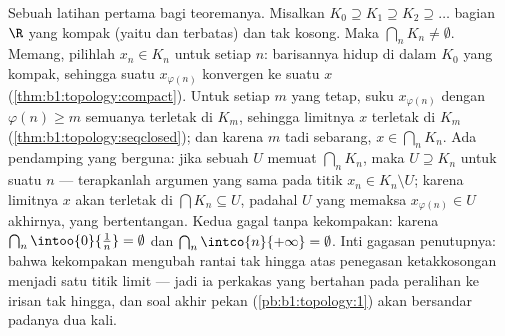 \begin{example}\label{ex:b1:topology:nested}
Sebuah latihan pertama bagi teoremanya. Misalkan $K_0 \supseteq K_1 \supseteq
K_2 \supseteq \dots$  bagian $\R$ yang kompak (yaitu  dan terbatas)
dan tak kosong. Maka $\bigcap_n K_n \neq \emptyset$. Memang, pilihlah $x_n
\in K_n$ untuk setiap $n$: barisannya hidup di dalam $K_0$ yang kompak,
sehingga suatu  $x_{\varphi(n)}$ konvergen ke suatu $x$
(\cref{thm:b1:topology:compact}). Untuk setiap $m$ yang tetap, suku
$x_{\varphi(n)}$ dengan $\varphi(n) \geq m$ semuanya terletak di  $K_m$, sehingga limitnya $x$ terletak di $K_m$
(\cref{thm:b1:topology:seqclosed}); dan karena $m$ tadi sebarang, $x \in
\bigcap_n K_n$. Ada pendamping yang berguna: jika sebuah  $U$ memuat
$\bigcap_n K_n$, maka $U \supseteq K_n$ untuk suatu $n$ --- terapkanlah
argumen yang sama pada titik $x_n \in K_n \setminus U$; karena limitnya
$x$ akan terletak di $\bigcap K_n \subseteq U$, padahal $U$ yang  memaksa
$x_{\varphi(n)} \in U$ akhirnya, yang bertentangan. Kedua
 gagal tanpa kekompakan: karena $\bigcap_n \intoo{0}{\frac
1n} = \emptyset$ dan $\bigcap_n \intco{n}{+\infty} = \emptyset$.
Inti gagasan penutupnya: bahwa kekompakan mengubah rantai tak hingga atas
penegasan ketakkosongan menjadi satu titik limit --- jadi ia perkakas
yang bertahan pada peralihan ke irisan tak hingga, dan soal
akhir pekan (\cref{pb:b1:topology:1}) akan bersandar padanya dua kali.
\end{example}

